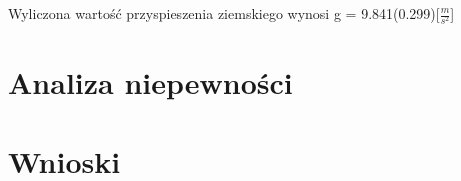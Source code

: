 \documentclass[a4paper,10pt]{article}
\begin{document}
Wyliczona wartość przyspieszenia ziemskiego wynosi g = 9.841(0.299)[$\frac{m}{s^2}$]
\section{Analiza niepewności}

\section{Wnioski}
\end{document}
